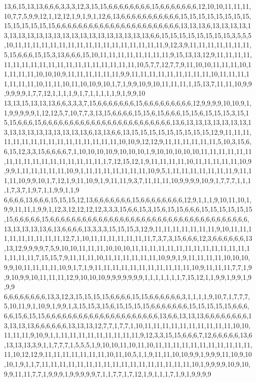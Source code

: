13,6,15,13,13,6,6,6,3,3,3,12,3,15,15,6,6,6,6,6,6,6,6,15,6,6,6,6,6,6,6,12,10,10,11,11,11,10,7,7,5,9,9,12,1,12,12,1,9,1,9,1,12,6,13,6,6,6,6,6,6,6,6,6,6,6,15,15,15,15,15,15,15,15,15,15,15,15,15,15,6,6,6,6,6,6,6,6,6,6,6,6,6,6,6,6,6,6,6,6,6,6,6,13,13,13,6,13,13,13,13,13,13,13,13,13,13,13,13,13,13,13,13,13,13,13,13,13,6,6,15,15,15,15,15,15,15,15,3,5,5,5,10,11,11,11,11,11,11,11,11,11,11,11,11,11,11,11,11,11,9,12,3,9,11,11,11,11,11,11,11,5,15,6,6,6,15,15,3,13,6,6,6,15,10,11,11,11,11,11,11,11,11,9,15,13,13,12,9,11,11,11,11,11,11,11,11,11,11,11,11,11,11,11,11,11,11,11,10,5,7,7,12,7,7,9,11,10,10,11,11,11,10,11,11,11,11,10,10,10,9,11,11,11,11,11,11,9,9,11,11,11,11,11,11,11,11,11,10,11,11,11,11,11,11,11,10,11,11,10,11,10,10,9,10,1,7,1,9,9,10,9,10,11,11,11,1,15,13,7,11,11,10,9,9,9,9,9,9,1,7,7,12,1,1,1,1,9,1,7,1,1,1,1,1,9,1,9,9,10
13,13,15,13,13,13,6,6,3,3,3,7,15,6,6,6,6,6,6,6,15,6,6,6,6,6,6,6,6,6,12,9,9,9,9,10,10,9,1,1,9,9,9,9,9,1,12,12,5,7,10,7,7,3,13,15,6,6,6,6,15,15,6,15,6,6,6,15,15,6,15,15,15,3,15,15,15,6,6,6,15,6,6,6,6,6,6,6,6,6,6,6,6,6,6,6,6,6,6,6,6,6,6,6,6,13,6,13,13,13,13,13,13,13,13,13,13,13,13,13,13,13,13,13,6,13,13,6,6,13,15,15,15,15,15,15,15,15,15,12,9,11,11,11,11,11,11,11,11,11,11,11,11,11,11,11,11,10,10,9,12,12,9,11,11,11,11,11,11,5,10,3,15,6,6,15,12,3,3,15,6,6,6,6,7,1,10,10,10,10,9,10,10,10,1,9,10,10,10,10,10,11,11,11,11,11,11,11,11,11,11,11,11,11,11,11,11,11,1,7,12,15,12,1,9,11,11,11,11,10,11,11,11,11,11,10,9,9,9,1,11,11,11,11,11,10,9,1,11,11,11,11,11,11,11,10,9,5,1,11,11,11,11,11,11,11,9,11,11,11,10,9,9,10,1,7,12,1,9,11,10,9,1,9,11,11,9,3,7,11,11,11,10,9,9,9,9,10,9,1,7,7,7,1,1,1,1,7,3,7,1,9,7,1,1,9,9,1,1,9
6,6,6,6,13,6,6,6,15,15,15,12,13,6,6,6,6,6,6,6,15,6,6,6,6,6,6,6,6,12,9,1,1,1,9,10,11,10,1,9,9,11,11,1,9,9,1,12,3,12,12,12,12,3,3,3,15,6,6,15,3,15,6,15,15,6,6,6,15,15,15,15,15,15,15,6,6,6,6,6,15,6,6,6,6,6,6,6,6,6,6,6,6,6,6,6,6,6,6,6,6,6,6,6,6,6,6,6,6,6,6,6,6,6,6,6,6,6,13,13,13,13,13,6,13,6,6,6,6,13,3,3,3,15,15,15,3,12,9,11,11,11,11,11,11,11,9,10,11,11,11,11,11,11,11,11,11,12,7,1,10,11,11,11,11,11,11,11,7,3,7,3,15,6,6,6,12,3,6,6,6,6,6,6,13,13,12,9,9,9,9,7,5,9,10,10,11,11,11,10,10,10,11,11,11,11,11,11,11,11,11,11,11,11,11,11,11,11,11,7,15,15,7,9,11,11,11,10,11,11,11,11,11,11,10,9,9,1,9,11,11,11,11,10,10,10,9,9,10,11,11,11,11,10,9,1,7,1,9,11,11,11,11,11,11,11,11,11,11,11,10,9,11,11,11,7,7,1,9,9,10,9,9,10,11,11,11,12,9,10,10,10,9,9,9,9,9,9,9,1,1,1,1,1,1,1,7,15,12,1,1,9,9,1,9,9,1,9,9,9
6,6,6,6,6,6,6,6,13,3,12,3,15,15,15,15,6,6,6,6,15,15,6,6,6,6,6,6,3,1,1,1,1,9,10,7,1,7,7,7,5,10,11,9,1,10,9,1,9,9,1,3,15,15,3,15,6,15,15,15,15,6,6,6,6,6,6,6,15,15,15,15,15,6,6,6,6,6,15,6,15,15,6,6,6,6,6,6,6,6,6,6,6,6,6,6,6,6,6,6,6,6,6,13,6,6,13,13,13,6,6,6,6,6,6,6,6,13,13,13,13,6,6,6,6,6,6,13,13,13,12,7,7,1,7,7,1,10,11,11,11,11,11,11,11,11,11,11,10,10,11,11,11,9,10,9,1,1,11,11,11,11,11,11,11,11,11,9,12,3,3,15,15,6,6,6,7,12,6,6,6,6,6,13,6,13,13,13,3,9,1,1,7,7,7,1,5,5,5,1,9,10,10,11,10,11,10,11,11,11,11,11,11,11,11,11,11,11,11,10,12,12,9,11,11,11,11,11,11,11,10,11,10,5,1,1,9,11,11,10,10,9,9,1,9,9,9,11,10,9,10,10,1,9,1,1,7,11,11,11,11,11,11,11,11,11,11,11,11,11,11,11,11,11,10,1,9,9,9,9,10,9,10,9,9,11,11,7,7,1,9,9,9,1,9,9,9,9,9,7,1,1,7,7,1,7,12,1,9,1,1,1,7,1,9,1,9,9,9,9
